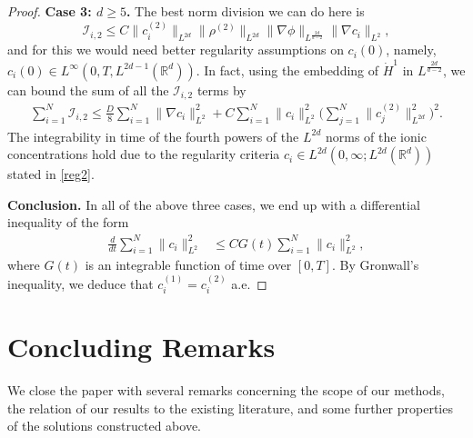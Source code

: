\documentclass[11pt,reqno]{amsart}
\newcommand{\be}{\begin{equation}}
\newcommand{\ee}{\end{equation}}
\newcommand{\R}{\mathbb R}
\begin{document}
\begin{proof}
\textbf{Case 3: $d\ge 5$.} 
The best norm division we can do here is 
\be 
\mathcal{I}_{i,2} \le C\|c_i^{(2)}\|_{L^{2d}} \|\rho^{(2)}\|_{L^{2d}} \|\nabla\phi\|_{L^{\frac{2d}{d-2}}} \|\nabla c_i\|_{L^2},
\ee
and for this we would need better regularity assumptions on $c_i(0)$, namely, $c_i(0) \in L^\infty(0,T,L^{2d-1}(\mathbb{R}^d)).$ In fact, using the embedding of $\dot{H}^1$ in $L^{\frac{2d}{d-2}}$, we can bound the sum of all the $\mathcal{I}_{i,2}$ terms by 
\be 
\begin{aligned}\label{t1case3}
\sum\limits_{i=1}^{N} \mathcal{I}_{i,2} \le \frac D8 \sum_{i=1}^N \|\nabla c_i\|_{L^2}^2 + C \sum_{i=1}^N\|c_i\|_{L^2}^2 \bigg(\sum_{j=1}^N \|c_j^{(2)}\|_{L^{2d}}^2 \bigg)^2 .
\end{aligned}
\ee The integrability in time of the fourth powers of the $L^{2d}$ norms of the ionic concentrations hold due to the regularity criteria $c_i \in L^{2d}(0, \infty; L^{2d}(\R^d))$ stated in \eqref{reg2}.

{\bf{Conclusion.}} In all of the above three cases, we end up with a differential inequality of the form 
\be 
\begin{aligned}
\frac{d}{dt}\sum_{i=1}^N \|c_i\|_{L^2}^2 & \le  C G(t) \sum_{i=1}^N\|c_i\|_{L^2}^2,
\end{aligned}
\ee where $G(t)$ is an integrable function of time over $[0,T]$. 
By Gronwall's inequality, we deduce that $c_i^{(1)} = c_i^{(2)}$ a.e. 
\end{proof}





\section{Concluding Remarks}\label{sec3}

We close the paper with several remarks concerning the scope of our
methods, the relation of our results to the existing literature, and
some further properties of the solutions constructed above.
\end{document}

